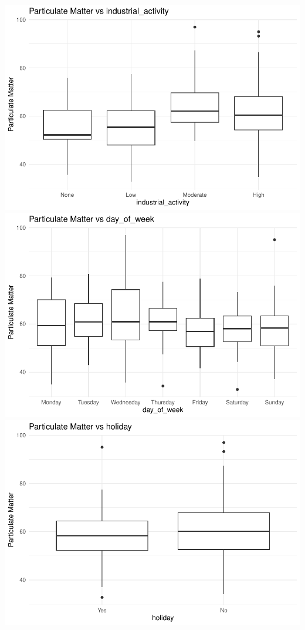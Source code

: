 \documentclass[
]{article}
\begin{document}
\includegraphics{Report_files/figure-latex/unnamed-chunk-2-1.pdf}
\includegraphics{Report_files/figure-latex/unnamed-chunk-2-2.pdf}
\includegraphics{Report_files/figure-latex/unnamed-chunk-2-3.pdf}
\end{document}
